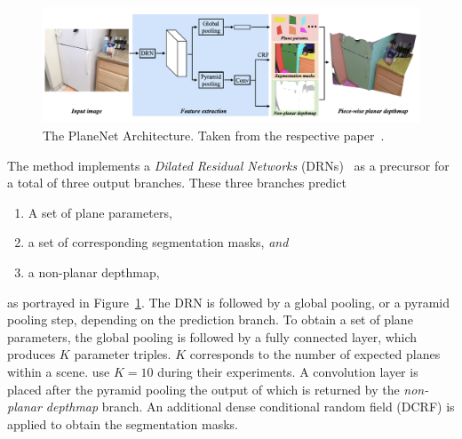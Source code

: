 \documentclass[main.tex]{subfiles}
\begin{document}
\begin{figure}[H]
    \centering
    \includegraphics[width=\textwidth]{images/planenet.png}
    \caption[PlaneNet Architecture]{The PlaneNet Architecture. Taken from the respective paper~\cite[Figure~2]{Liu_Yang_Ceylan_Yumer_Furukawa_2018}.}
    \label{fig:planenet}
\end{figure}


The method implements a \textit{Dilated Residual Networks} (DRNs)~\cite{yu2017dilated} as a precursor for a total of three output branches.
These three branches predict
\begin{enumerate}
    \item A set of plane parameters,
    \item a set of corresponding segmentation masks, \textit{and}
    \item a non-planar depthmap,
\end{enumerate}
as portrayed in Figure~\ref{fig:planenet}. The DRN is followed by a global pooling, or a pyramid pooling step, depending on the prediction branch.
To obtain a set of plane parameters, the global pooling is followed by a fully connected layer, which produces $K$ parameter triples. $K$ corresponds to the number of
expected planes within a scene. \citeauthor{Liu_Yang_Ceylan_Yumer_Furukawa_2018}\cite{Liu_Yang_Ceylan_Yumer_Furukawa_2018} use $K=10$ during their experiments.
A convolution layer is placed after the pyramid pooling the output of which is returned by the \textit{non-planar depthmap} branch.
An additional dense conditional random field (DCRF) is applied to obtain the segmentation masks.
\end{document}
